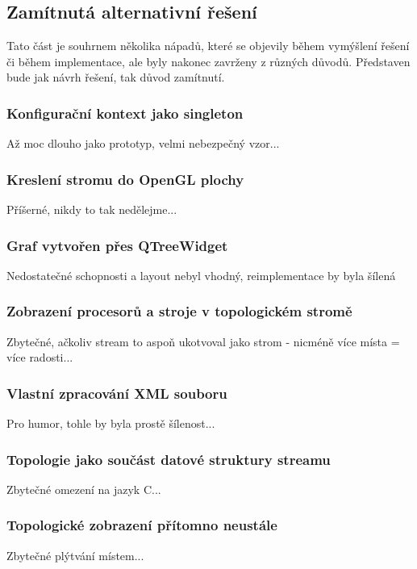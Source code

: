 
\subsection{Zamítnutá alternativní řešení}
Tato část je souhrnem několika nápadů, které se objevily během vymýšlení řešení či během implementace, ale byly nakonec zavrženy z různých důvodů. Představen bude jak návrh řešení, tak důvod zamítnutí.

\subsubsection*{Konfigurační kontext jako singleton}
Až moc dlouho jako prototyp, velmi nebezpečný vzor...

\subsubsection*{Kreslení stromu do OpenGL plochy}
Příšerné, nikdy to tak nedělejme...

\subsubsection*{Graf vytvořen přes QTreeWidget}
Nedostatečné schopnosti a layout nebyl vhodný, reimplementace by byla šílená

\subsubsection*{Zobrazení procesorů a stroje v topologickém stromě}
Zbytečné, ačkoliv stream to aspoň ukotvoval jako strom - nicméně více místa = více radosti...

\subsubsection*{Vlastní zpracování XML souboru}
Pro humor, tohle by byla prostě šílenost...

\subsubsection*{Topologie jako součást datové struktury streamu}
Zbytečné omezení na jazyk C...

\subsubsection*{Topologické zobrazení přítomno neustále}
Zbytečné plýtvání místem...

